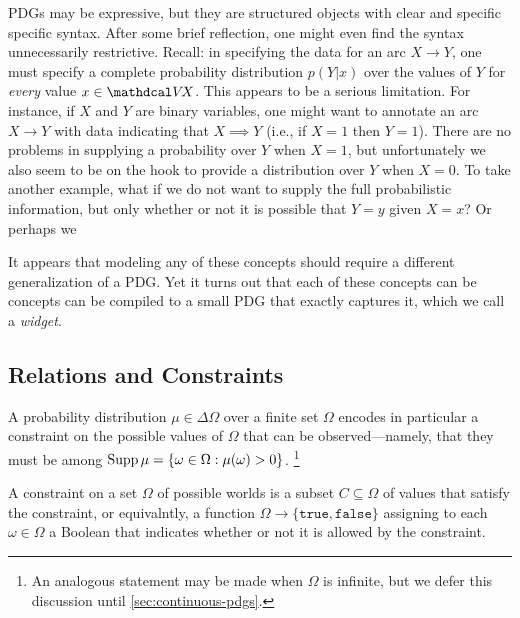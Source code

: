 PDGs may be expressive, but they are structured objects with clear and specific specific syntax.
After some brief reflection, one might even find the syntax unnecessarily restrictive. 
Recall: in specifying the data for an arc $X \to Y$, one must specify a complete probability distribution $p(Y | x)$ over the values of $Y$ for \emph{every} value $x \in \V\!X$. 
This appears to be a serious limitation.
For instance, if $X$ and $Y$ are binary variables, one might want to 
annotate an arc $X \to Y$ with data indicating that $X \implies Y$
    (i.e., if $X=1$ then $Y=1$).
There are no problems in supplying a probability over $Y$ when $X{=}1$,
but unfortunately we also seem to be on the hook to provide
    a distribution over $Y$ when $X{=}0$. 
To take another example, what if we do not want to supply the full probabilistic information, but only whether or not it is possible that $Y{=}y$ given $X{=}x$? 
Or perhaps we 

It appears that modeling any of these concepts should require a different generalization of a PDG. 
Yet it turns out that each of these concepts can be concepts can be compiled to a small PDG that exactly captures it, which we call a \emph{widget}. 


\subsection{Relations and Constraints}
\label{sec:relation-widget}

A probability distribution $\mu \in \Delta \Omega$ over 
    a finite set $\Omega$ encodes in particular a constraint
    on the possible values of $\Omega$ that can be observed---namely, that
they must be among $\operatorname{\mathrm{Supp}} \mu = \{ \omega \in \Omega : \mu(\omega) > 0 \}$. 
\unskip\footnote{An analogous statement may be made when $\Omega$ is infinite, 
    but we defer this discussion until \cref{sec:continuous-pdgs}.}


A constraint on a set $\Omega$ of possible worlds is a subset $C \subseteq \Omega$
of values that satisfy the constraint, or equivalntly, 
a function $\Omega \to \{\mathtt{true}, \mathtt{false}\}$ assigning to each $\omega \in \Omega$ a Boolean that indicates whether or not it is allowed by the constraint. 
    
